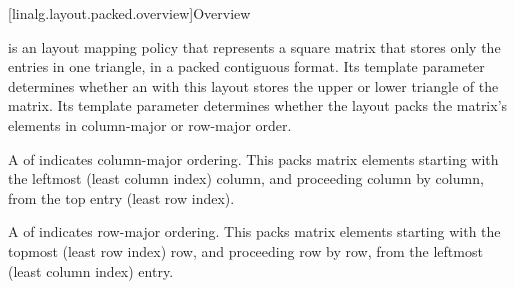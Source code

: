 [linalg.layout.packed.overview]{Overview}

\pnum
{} is an  layout mapping policy
that represents a square matrix that stores only the entries in one
triangle, in a packed contiguous format.
Its  template parameter determines
whether an  with this layout
stores the upper or lower triangle of the matrix.
Its  template parameter determines
whether the layout packs the matrix's elements
in column-major or row-major order.

\pnum
A  of 
indicates column-major ordering.
This packs matrix elements
starting with the leftmost (least column index) column, and
proceeding column by column, from the top entry (least row index).

\pnum
A  of 
indicates row-major ordering.
This packs matrix elements
starting with the topmost (least row index) row, and
proceeding row by row, from the leftmost (least column index) entry.

